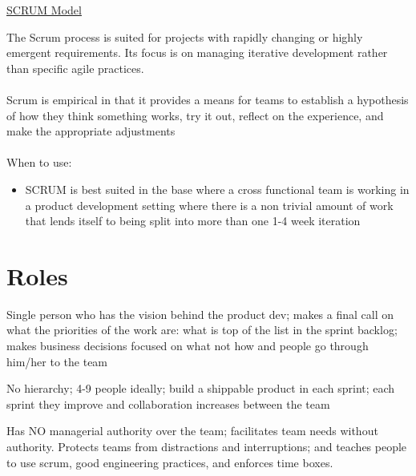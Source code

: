 \documentclass{article}[18pt]
\begin{document}
\begin{center}
\underline{\huge SCRUM Model}
\end{center}
The Scrum process is suited for projects with rapidly changing or highly emergent requirements. Its focus is on managing iterative development rather than specific agile practices.\\
\\
Scrum is empirical in that it provides a means for teams to establish a hypothesis of how they think something works, try it out, reflect on the experience, and make the appropriate adjustments\\
\\
When to use:
\begin{itemize}
	\item SCRUM is best suited in the base where a cross functional team is working in a product development setting where there is a non trivial amount of work that lends itself to being split into more than one 1-4 week iteration
\end{itemize}
\section{Roles}
\begin{definition}
	Single person who has the vision behind the product dev; makes a final call on what the priorities of the work are: what is top of the list in the sprint backlog; makes business decisions focused on what not how and people go through him/her to the team
\end{definition}

\begin{definition}
	No hierarchy; 4-9 people ideally; build a shippable product in each sprint; each sprint they improve and collaboration increases between the team
\end{definition}


\begin{definition}
	Has NO managerial authority over the team; facilitates team needs without authority.  Protects teams from distractions and interruptions; and teaches people to use scrum, good engineering practices, and enforces time boxes.
\end{definition}
\end{document}
